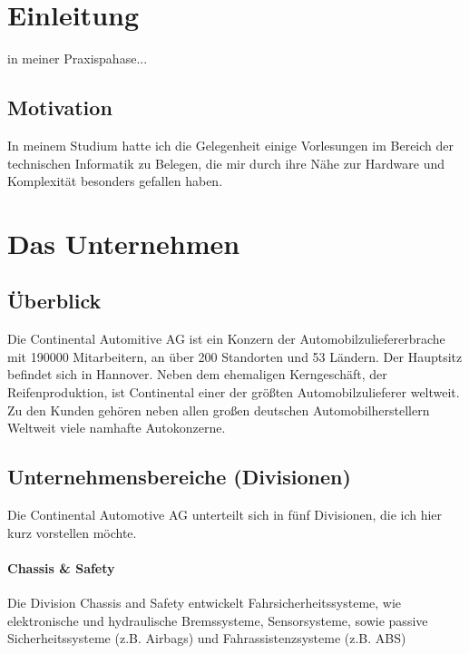 \section{Einleitung}
in meiner Praxispahase...
\subsection{Motivation}
In meinem Studium hatte ich die Gelegenheit einige Vorlesungen im Bereich der technischen Informatik zu Belegen, die mir durch ihre Nähe zur Hardware und Komplexität besonders gefallen haben.
\section{Das Unternehmen}
\subsection{Überblick}


Die Continental Automitive AG ist ein Konzern der Automobilzuliefererbrache mit 190000 Mitarbeitern, an über 200 Standorten und 53 Ländern. Der Hauptsitz befindet sich in Hannover. Neben dem ehemaligen Kerngeschäft, der Reifenproduktion, ist Continental einer der größten Automobilzulieferer weltweit. Zu den Kunden gehören neben allen großen deutschen Automobilherstellern Weltweit viele namhafte Autokonzerne.




\subsection{Unternehmensbereiche (Divisionen)}


Die Continental Automotive AG unterteilt sich in fünf Divisionen, die ich hier kurz vorstellen möchte. 

\paragraph{Chassis \& Safety}
Die Division Chassis and Safety entwickelt Fahrsicherheitssysteme, wie elektronische und hydraulische Bremssysteme, Sensorsysteme, sowie passive Sicherheitssysteme (z.B. Airbags) und Fahrassistenzsysteme (z.B. ABS) 

